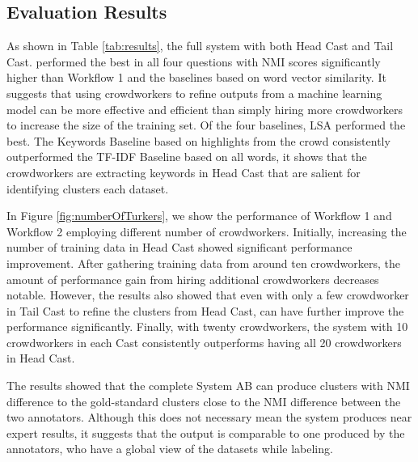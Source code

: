 \subsection{Evaluation Results}

As shown in Table \ref{tab:results}, the full system with both Head Cast and Tail Cast.
performed the best in all four questions with NMI scores
significantly higher than Workflow 1 and the baselines based on word
vector similarity.  It suggests that using crowdworkers to refine outputs from
a machine learning model can be more effective and efficient than simply hiring
more crowdworkers to increase the size of the training set. Of the four
baselines, LSA performed the best.  The Keywords Baseline based on highlights from the crowd
consistently outperformed the TF-IDF Baseline based on all words, it
shows that the crowdworkers are extracting keywords in Head Cast that are
salient for identifying clusters each dataset.

In Figure \ref{fig:numberOfTurkers}, we show the performance of Workflow 1 and
Workflow 2 employing different number of crowdworkers.  Initially, increasing the
number of training data in Head Cast showed significant performance improvement.
After gathering training data from around ten crowdworkers, the amount of performance
gain from hiring additional crowdworkers decreases notable. However, the
results also showed that even with only a few crowdworker in Tail Cast to refine
the clusters from Head Cast, can have further improve the performance significantly. Finally,
with twenty crowdworkers, the system with 10 crowdworkers in each Cast
consistently outperforms having all 20 crowdworkers in Head Cast.

The results showed that the complete System AB can produce clusters with NMI
difference to the gold-standard clusters close to the NMI difference between
the two annotators. Although this does not necessary mean the system produces
near expert results, it suggests that the output is comparable to one produced
by the annotators, who have a global view of the datasets while labeling.

